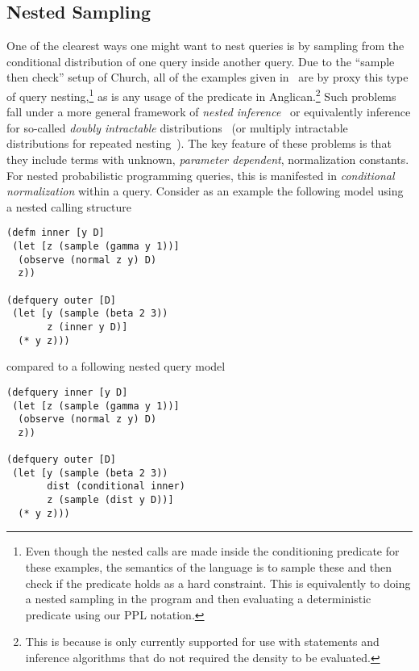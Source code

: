 \subsection{Nested Sampling}
\label{sec:nest:imp:sampling}

One of the clearest ways one might want to nest queries is by sampling from the conditional
distribution of one query inside another query.  Due to the ``sample then check'' setup of
Church, all of the examples given in~\cite{stuhlmuller2014reasoning} are by proxy this
type of query nesting,\footnote{Even though the nested calls are made inside the conditioning
	predicate for these examples, the semantics of the language is to sample these
	and then check if the predicate holds as a hard constraint.  This is equivalently to doing a nested
	sampling in the program and then evaluating a deterministic predicate using our PPL notation.}
as is any usage of the \conditional predicate in Anglican.\footnote{This is because 
	 is only currently supported for use
with  statements and inference algorithms that do not required the density to be evaluated.}
Such problems fall under a more general framework of \emph{nested inference}~\cite{mantadelis2011nesting} or equivalently inference for so-called
\emph{doubly intractable} distributions~\citep{murray2006mcmc} (or multiply intractable
	distributions for repeated nesting~\citep{stuhlmuller2014reasoning}).
	 The key feature of these problems is that they include
terms with unknown, \emph{parameter dependent}, normalization constants.  For nested probabilistic programming
queries, this is manifested in \emph{conditional normalization} within a query.
Consider as an example the following model using a nested calling structure
\vspace{-15pt}
\begin{lstlisting}[basicstyle=\ttfamily\footnotesize,multicols=2,frame=none]
(defm inner [y D]
 (let [z (sample (gamma y 1))]
  (observe (normal z y) D)
  z))

(defquery outer [D]
 (let [y (sample (beta 2 3))
       z (inner y D)]
  (* y z)))
\end{lstlisting}
\vspace{-25pt}
compared to a following nested query model
\vspace{-15pt}
\begin{lstlisting}[basicstyle=\ttfamily\footnotesize,multicols=2,frame=none]
(defquery inner [y D]
 (let [z (sample (gamma y 1))]
  (observe (normal z y) D)
  z))
  
(defquery outer [D]
 (let [y (sample (beta 2 3))
       dist (conditional inner)
       z (sample (dist y D))]
  (* y z)))
\end{lstlisting}
